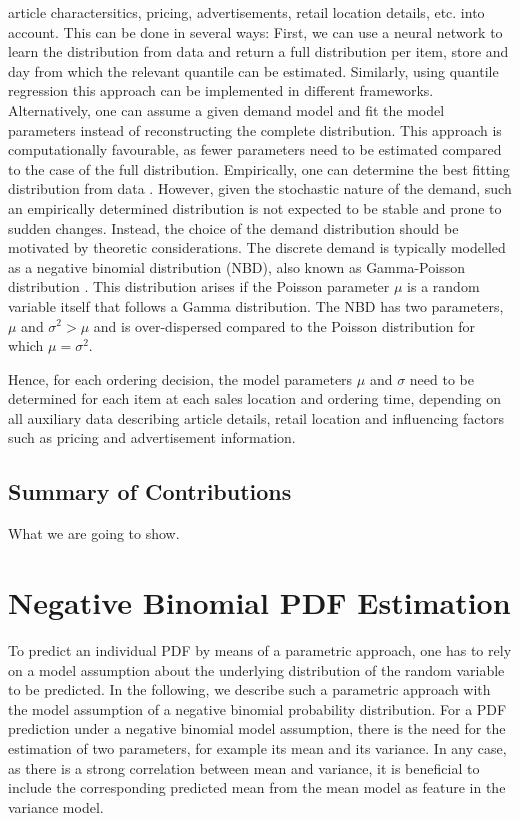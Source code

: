 \documentclass[BCOR=1mm, DIV=calc,10pt,
twoside=true,
twocolumn,
headings=normal]{scrartcl}
\begin{document}
article charactersitics, pricing, advertisements, retail location details, etc. into
account. This can be done in several ways: First, we can use a neural network
\cite{Feindt2006190} to learn the distribution from data and return a full distribution
per item, store and day from which the relevant quantile can be estimated. Similarly,
using quantile regression \cite{koenker2001} this approach can be implemented in different
frameworks. Alternatively, one can assume a given demand model and fit the model
parameters instead of reconstructing the complete distribution. This approach is
computationally favourable, as fewer parameters need to be estimated compared to the case
of the full distribution. Empirically, one can determine the best fitting distribution
from data \cite{adan1995}. However, given the stochastic nature of the demand, such an
empirically determined distribution is not expected to be stable and prone to sudden
changes. Instead, the choice of the demand distribution should be motivated by theoretic
considerations. The discrete demand is typically modelled as a negative binomial
distribution (NBD), also known as Gamma-Poisson distribution
\cite{Ehrenberg1959,Ehrenberg1967,Ehrenberg1972,Chatfield1973,Schmittlein_1985}. This
distribution arises if the Poisson parameter $\mu$ is a random variable itself that
follows a Gamma distribution. The NBD has two parameters, $\mu$ and $ \sigma^2 > \mu$ and
is over-dispersed compared to the Poisson distribution for which $\mu = \sigma^2$.

Hence, for each ordering decision, the model parameters $\mu$ and $\sigma$ need to be
determined for each item at each sales location and ordering time, depending on all
auxiliary data describing article details, retail location and influencing factors such as
pricing and advertisement information.

\subsection*{Summary of Contributions}
What we are going to show.


\section{Negative Binomial PDF Estimation}
\label{sec:pdfEstimation}

To predict an individual PDF by means of a parametric approach, one has to rely on a model
assumption about the underlying distribution of the random variable to be predicted. In
the following, we describe such a parametric approach with the model assumption of a
negative binomial probability distribution. For a PDF prediction under a negative binomial
model assumption, there is the need for the estimation of two parameters, for example its
mean and its variance.
In any case, as there is a strong correlation between mean and variance, it is beneficial to include the corresponding
predicted mean from the mean model as feature in the variance model.
\end{document}
